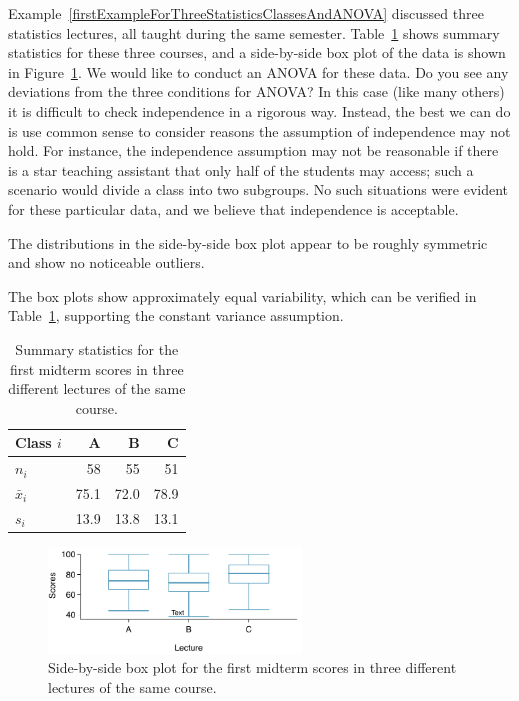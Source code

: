 \begin{example}{Example~\vref{firstExampleForThreeStatisticsClassesAndANOVA} discussed three statistics lectures, all taught during the same semester. Table~\ref{summaryStatisticsForClassTestData} shows summary statistics for these three courses, and a side-by-side box plot of the data is shown in Figure~\ref{classDataSBSBoxPlot}. We would like to conduct an ANOVA for these data. Do you see any deviations from the three conditions for ANOVA?}
In this case (like many others) it is difficult to check independence in a rigorous way. Instead, the best we can do is use common sense to consider reasons the assumption of independence may not hold. For instance, the independence assumption may not be reasonable if there is a star teaching assistant that only half of the students may access; such a scenario would divide a class into two subgroups. No such situations were evident for these particular data, and we believe that independence is acceptable.

The distributions in the side-by-side box plot appear to be roughly symmetric and show no noticeable outliers.

The box plots show approximately equal variability, which can be verified in Table~\ref{summaryStatisticsForClassTestData}, supporting the constant variance assumption.
\end{example}

\begin{table}
\centering
\begin{tabular}{lrrr}
  \hline
Class $i$	& A	& B	& C \\
  \hline
$n_i$		& 58	& 55	& 51 \\
$\bar{x}_i$	& 75.1	& 72.0	& 78.9 \\
$s_i$		& 13.9	& 13.8	& 13.1 \\
\hline
\end{tabular}
\caption{Summary statistics for the first midterm scores in three different lectures of the same course.}
\label{summaryStatisticsForClassTestData}
\end{table}

\begin{figure}
\centering
\includegraphics[width=0.6\textwidth]{ch_inference_for_means/figures/classData/classDataSBSBoxPlot}
\caption{Side-by-side box plot for the first midterm scores in three different  lectures of the same course.\textA{\vspace{-3mm}}}
\label{classDataSBSBoxPlot}
\end{figure}

